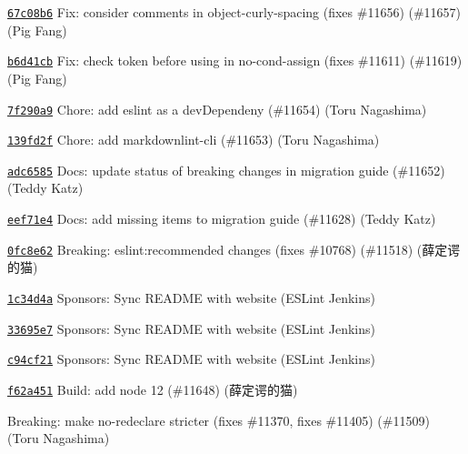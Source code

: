 \begin{DoxyItemize}
\item \href{https://github.com/eslint/eslint/commit/67c08b67509c54acd96aab2cec22efb53bfe6265}{\texttt{ {\ttfamily 67c08b6}}} Fix\+: consider comments in object-\/curly-\/spacing (fixes \#11656) (\#11657) (Pig Fang)
\item \href{https://github.com/eslint/eslint/commit/b6d41cbe28a8b28b1c1d9aa36cb4c349c73f6f1d}{\texttt{ {\ttfamily b6d41cb}}} Fix\+: check token before using in no-\/cond-\/assign (fixes \#11611) (\#11619) (Pig Fang)
\item \href{https://github.com/eslint/eslint/commit/7f290a9044ca795884ac2e495cd31b2a35f109a6}{\texttt{ {\ttfamily 7f290a9}}} Chore\+: add eslint as a dev\+Dependeny (\#11654) (Toru Nagashima)
\item \href{https://github.com/eslint/eslint/commit/139fd2f1254bcc524738f8c2645e0847df95e0d0}{\texttt{ {\ttfamily 139fd2f}}} Chore\+: add markdownlint-\/cli (\#11653) (Toru Nagashima)
\item \href{https://github.com/eslint/eslint/commit/adc6585ce074e03fc8a842e8ebc5b082a0ed0b65}{\texttt{ {\ttfamily adc6585}}} Docs\+: update status of breaking changes in migration guide (\#11652) (Teddy Katz)
\item \href{https://github.com/eslint/eslint/commit/eef71e455e67040168c8df8a6c9c2b4fbe805a50}{\texttt{ {\ttfamily eef71e4}}} Docs\+: add missing items to migration guide (\#11628) (Teddy Katz)
\item \href{https://github.com/eslint/eslint/commit/0fc8e62818bc8d0a0a804b59c6110818844df5f3}{\texttt{ {\ttfamily 0fc8e62}}} Breaking\+: eslint\+:recommended changes (fixes \#10768) (\#11518) (薛定谔的猫)
\item \href{https://github.com/eslint/eslint/commit/1c34d4a6313c399761281282fff3a1bbe5e17b6d}{\texttt{ {\ttfamily 1c34d4a}}} Sponsors\+: Sync R\+E\+A\+D\+ME with website (E\+S\+Lint Jenkins)
\item \href{https://github.com/eslint/eslint/commit/33695e7f7048306ac196eff6e5a16e165ad03090}{\texttt{ {\ttfamily 33695e7}}} Sponsors\+: Sync R\+E\+A\+D\+ME with website (E\+S\+Lint Jenkins)
\item \href{https://github.com/eslint/eslint/commit/c94cf212d31513fde74e0ea88b79e5e0f89a18a4}{\texttt{ {\ttfamily c94cf21}}} Sponsors\+: Sync R\+E\+A\+D\+ME with website (E\+S\+Lint Jenkins)
\item \href{https://github.com/eslint/eslint/commit/f62a4510b007172c7160f007a6ec2aa2c9a80dd7}{\texttt{ {\ttfamily f62a451}}} Build\+: add node 12 (\#11648) (薛定谔的猫)
\item \href{https://github.com/eslint/eslint/commit/20364cc4f7fe0423adce0dd44fb24fc48e1cae4b}{\texttt{ {}}} Breaking\+: make no-\/redeclare stricter (fixes \#11370, fixes \#11405) (\#11509) (Toru Nagashima)

\end{DoxyItemize}
